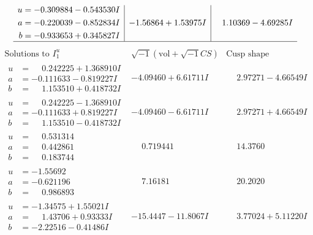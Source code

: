 \documentclass[1p]{elsarticle_modified}
\theoremstyle{definition}
\newcommand{\I}{\sqrt{-1}}
\begin{document}
$$\begin{array}{c|c|c}
\begin{aligned}
u &= -0.309884 - 0.543530 I \\
a &= -0.220039 - 0.852834 I \\
b &= -0.933653 + 0.345827 I\end{aligned}
 & -1.56864 + 1.53975 I & \phantom{-}1.10369 - 4.69285 I\\
 \hline 
 \end{array}$$\newpage$$\begin{array}{c|c|c}  
\text{Solutions to }I^u_{1}& \I (\text{vol} + \sqrt{-1}CS) & \text{Cusp shape}\\
 \hline 
\begin{aligned}
u &= \phantom{-}0.242225 + 1.368910 I \\
a &= -0.111633 - 0.819227 I \\
b &= \phantom{-}1.153510 + 0.418732 I\end{aligned}
 & -4.09460 + 6.61711 I & \phantom{-}2.97271 - 4.66549 I \\ \hline\begin{aligned}
u &= \phantom{-}0.242225 - 1.368910 I \\
a &= -0.111633 + 0.819227 I \\
b &= \phantom{-}1.153510 - 0.418732 I\end{aligned}
 & -4.09460 - 6.61711 I & \phantom{-}2.97271 + 4.66549 I \\ \hline\begin{aligned}
u &= \phantom{-}0.531314\phantom{ +0.000000I} \\
a &= \phantom{-}0.442861\phantom{ +0.000000I} \\
b &= \phantom{-}0.183744\phantom{ +0.000000I}\end{aligned}
 & \phantom{-}0.719441\phantom{ +0.000000I} & \phantom{-}14.3760\phantom{ +0.000000I} \\ \hline\begin{aligned}
u &= -1.55692\phantom{ +0.000000I} \\
a &= -0.621196\phantom{ +0.000000I} \\
b &= \phantom{-}0.986893\phantom{ +0.000000I}\end{aligned}
 & \phantom{-}7.16181\phantom{ +0.000000I} & \phantom{-}20.2020\phantom{ +0.000000I} \\ \hline\begin{aligned}
u &= -1.34575 + 1.55021 I \\
a &= \phantom{-}1.43706 + 0.93333 I \\
b &= -2.22516 - 0.41486 I\end{aligned}
 & -15.4447 - 11.8067 I & \phantom{-}3.77024 + 5.11220 I \\ \hline\begin{aligned}

\end{aligned}
\end{array}$$
\end{document}
